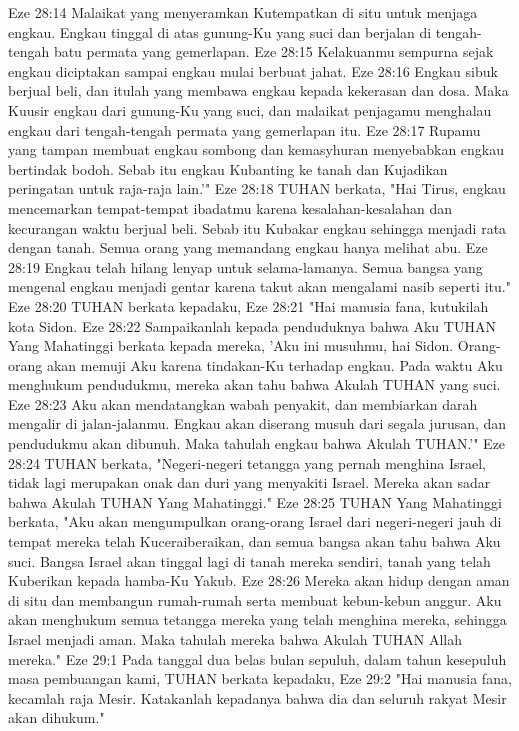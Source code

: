 Eze 28:14  Malaikat yang menyeramkan Kutempatkan di situ untuk menjaga engkau. Engkau tinggal di atas gunung-Ku yang suci dan berjalan di tengah-tengah batu permata yang gemerlapan.
Eze 28:15  Kelakuanmu sempurna sejak engkau diciptakan sampai engkau mulai berbuat jahat.
Eze 28:16  Engkau sibuk berjual beli, dan itulah yang membawa engkau kepada kekerasan dan dosa. Maka Kuusir engkau dari gunung-Ku yang suci, dan malaikat penjagamu menghalau engkau dari tengah-tengah permata yang gemerlapan itu.
Eze 28:17  Rupamu yang tampan membuat engkau sombong dan kemasyhuran menyebabkan engkau bertindak bodoh. Sebab itu engkau Kubanting ke tanah dan Kujadikan peringatan untuk raja-raja lain.'"
Eze 28:18  TUHAN berkata, "Hai Tirus, engkau mencemarkan tempat-tempat ibadatmu karena kesalahan-kesalahan dan kecurangan waktu berjual beli. Sebab itu Kubakar engkau sehingga menjadi rata dengan tanah. Semua orang yang memandang engkau hanya melihat abu.
Eze 28:19  Engkau telah hilang lenyap untuk selama-lamanya. Semua bangsa yang mengenal engkau menjadi gentar karena takut akan mengalami nasib seperti itu."
Eze 28:20  TUHAN berkata kepadaku,
Eze 28:21  "Hai manusia fana, kutukilah kota Sidon.
Eze 28:22  Sampaikanlah kepada penduduknya bahwa Aku TUHAN Yang Mahatinggi berkata kepada mereka, 'Aku ini musuhmu, hai Sidon. Orang-orang akan memuji Aku karena tindakan-Ku terhadap engkau. Pada waktu Aku menghukum pendudukmu, mereka akan tahu bahwa Akulah TUHAN yang suci.
Eze 28:23  Aku akan mendatangkan wabah penyakit, dan membiarkan darah mengalir di jalan-jalanmu. Engkau akan diserang musuh dari segala jurusan, dan pendudukmu akan dibunuh. Maka tahulah engkau bahwa Akulah TUHAN.'"
Eze 28:24  TUHAN berkata, "Negeri-negeri tetangga yang pernah menghina Israel, tidak lagi merupakan onak dan duri yang menyakiti Israel. Mereka akan sadar bahwa Akulah TUHAN Yang Mahatinggi."
Eze 28:25  TUHAN Yang Mahatinggi berkata, "Aku akan mengumpulkan orang-orang Israel dari negeri-negeri jauh di tempat mereka telah Kuceraiberaikan, dan semua bangsa akan tahu bahwa Aku suci. Bangsa Israel akan tinggal lagi di tanah mereka sendiri, tanah yang telah Kuberikan kepada hamba-Ku Yakub.
Eze 28:26  Mereka akan hidup dengan aman di situ dan membangun rumah-rumah serta membuat kebun-kebun anggur. Aku akan menghukum semua tetangga mereka yang telah menghina mereka, sehingga Israel menjadi aman. Maka tahulah mereka bahwa Akulah TUHAN Allah mereka."
Eze 29:1  Pada tanggal dua belas bulan sepuluh, dalam tahun kesepuluh masa pembuangan kami, TUHAN berkata kepadaku,
Eze 29:2  "Hai manusia fana, kecamlah raja Mesir. Katakanlah kepadanya bahwa dia dan seluruh rakyat Mesir akan dihukum."
